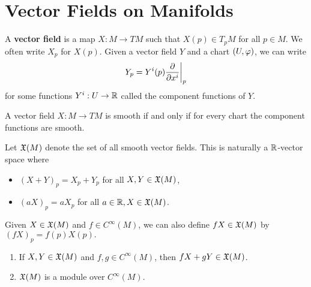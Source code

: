 \section{Vector Fields on Manifolds}
A \textbf{vector field} is a map $X:M \to TM$ such that $X(p) \in T_pM$ for all $p \in M$. We often write $X_p$ for $X(p)$. Given a vector field $Y$ and a chart $(U,\varphi)$, we can write
$$ Y_p = Y^i(p) \pdv{}{x^i}\bigg|_p $$
for some functions $Y^i:U \to \mathbb{R}$ called the component functions of $Y$. 
\begin{proposition}
    A vector field $X:M \to TM$ is smooth if and only if for every chart the component functions are smooth. 
\end{proposition}

Let $\mathfrak{X}(M)$ denote the set of all smooth vector fields. This is naturally a $\mathbb{R}$-vector space where
\begin{itemize}
    \item $(X+Y)_p = X_p + Y_p$ for all $X,Y \in \mathfrak{X}(M)$,
    \item $(aX)_p = aX_p$ for all $a \in \mathbb{R}, X \in \mathfrak{X}(M)$. 
\end{itemize}
Given $X \in \mathfrak{X}(M)$ and $f \in C^\infty(M)$, we can also define $fX \in \mathfrak{X}(M)$ by 
$(fX)_p = f(p)X(p). $

\begin{proposition}
\begin{enumerate}
    \item If $X,Y \in \mathfrak{X}(M)$ and $f,g \in C^\infty(M)$, then $fX+gY \in \mathfrak{X}(M)$. 
    \item $\mathfrak{X}(M)$ is a module over $C^\infty(M)$. 
\end{enumerate}
\end{proposition}

